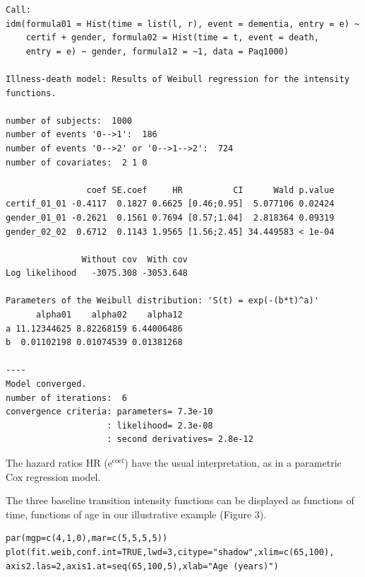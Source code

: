 \documentclass{article}
\begin{document}
\begin{verbatim}
Call:
idm(formula01 = Hist(time = list(l, r), event = dementia, entry = e) ~ 
    certif + gender, formula02 = Hist(time = t, event = death, 
    entry = e) ~ gender, formula12 = ~1, data = Paq1000)

Illness-death model: Results of Weibull regression for the intensity functions.

number of subjects:  1000 
number of events '0-->1':  186 
number of events '0-->2' or '0-->1-->2':  724 
number of covariates:  2 1 0 

                coef SE.coef     HR          CI      Wald p.value
certif_01_01 -0.4117  0.1827 0.6625 [0.46;0.95]  5.077106 0.02424
gender_01_01 -0.2621  0.1561 0.7694 [0.57;1.04]  2.818364 0.09319
gender_02_02  0.6712  0.1143 1.9565 [1.56;2.45] 34.449583 < 1e-04

               Without cov  With cov
Log likelihood   -3075.308 -3053.648

Parameters of the Weibull distribution: 'S(t) = exp(-(b*t)^a)'
      alpha01    alpha02    alpha12
a 11.12344625 8.82268159 6.44006486
b  0.01102198 0.01074539 0.01381268

----
Model converged.
number of iterations:  6 
convergence criteria: parameters= 7.3e-10 
                    : likelihood= 2.3e-08 
                    : second derivatives= 2.8e-12
\end{verbatim}

The hazard ratios HR ($\mathrm{e}^{\text{coef}}$) have the usual interpretation, 
as in a parametric Cox regression model.

The three baseline transition intensity functions can be displayed as
functions of time, functions of age in our illustrative example (Figure 3).
\lstset{basicstyle=\small\tt,numbers=left,language=R,label=paq-fit-weib}
\begin{lstlisting}
par(mgp=c(4,1,0),mar=c(5,5,5,5))
plot(fit.weib,conf.int=TRUE,lwd=3,citype="shadow",xlim=c(65,100), axis2.las=2,axis1.at=seq(65,100,5),xlab="Age (years)")
\end{lstlisting}
\end{document}
